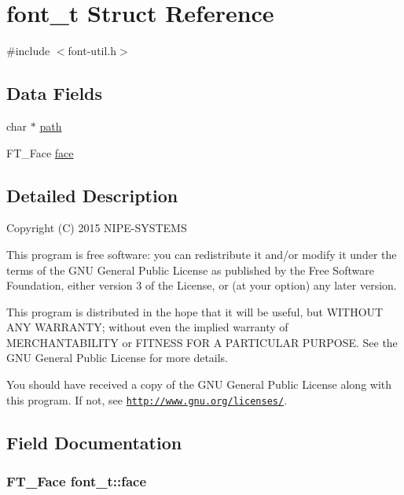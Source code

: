 \hypertarget{structfont__t}{}\section{font\+\_\+t Struct Reference}
\label{structfont__t}


{\ttfamily \#include $<$font-\/util.\+h$>$}

\subsection*{Data Fields}
\begin{DoxyCompactItemize}
\item 
char $\ast$ \hyperlink{structfont__t_a5e3dd9dc422392492027e5c3e598898a}{path}
\item 
F\+T\+\_\+\+Face \hyperlink{structfont__t_a3202af0602b252c4db01cdefcd3691d4}{face}
\end{DoxyCompactItemize}


\subsection{Detailed Description}
Copyright (C) 2015 N\+I\+P\+E-\/\+S\+Y\+S\+T\+E\+M\+S

This program is free software\+: you can redistribute it and/or modify it under the terms of the G\+N\+U General Public License as published by the Free Software Foundation, either version 3 of the License, or (at your option) any later version.

This program is distributed in the hope that it will be useful, but W\+I\+T\+H\+O\+U\+T A\+N\+Y W\+A\+R\+R\+A\+N\+T\+Y; without even the implied warranty of M\+E\+R\+C\+H\+A\+N\+T\+A\+B\+I\+L\+I\+T\+Y or F\+I\+T\+N\+E\+S\+S F\+O\+R A P\+A\+R\+T\+I\+C\+U\+L\+A\+R P\+U\+R\+P\+O\+S\+E. See the G\+N\+U General Public License for more details.

You should have received a copy of the G\+N\+U General Public License along with this program. If not, see \href{http://www.gnu.org/licenses/}{\tt http\+://www.\+gnu.\+org/licenses/}. 

\subsection{Field Documentation}
\hypertarget{structfont__t_a3202af0602b252c4db01cdefcd3691d4}{}
\subsubsection[{face}]{\setlength{\rightskip}{0pt plus 5cm}F\+T\+\_\+\+Face font\+\_\+t\+::face}\label{structfont__t_a3202af0602b252c4db01cdefcd3691d4}
\hypertarget{structfont__t_a5e3dd9dc422392492027e5c3e598898a}{}
